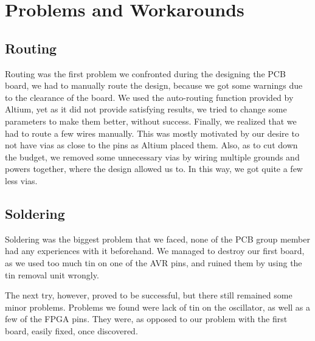 \section {Problems and Workarounds}
\subsection{Routing}
Routing was the first problem we confronted during the designing the \ac{PCB}
board, we had to manually route the design, because we got some warnings due to
the clearance of the board. We used the auto-routing function provided by
Altium, yet as it did not provide satisfying results, we tried to change some
parameters to make them better, without success. Finally, we realized that we
had to route a few wires manually. This was mostly motivated by our desire to
not have vias as close to the pins as Altium placed them. Also, as to cut down
the budget, we removed some unnecessary vias by wiring multiple grounds and
powers together, where the design allowed us to. In this way, we got quite a few
less vias.
\subsection{Soldering}
Soldering was the biggest problem that we faced, none of the \ac{PCB} group
member had any experiences with it beforehand. We managed to destroy our first
board, as we used too much tin on one of the AVR pins, and ruined them by using
the tin removal unit wrongly.

The next try, however, proved to be successful, but there still remained some
minor problems. Problems we found were lack of tin on the oscillator, as well as
a few of the \ac{FPGA} pins. They were, as opposed to our problem with the first
board, easily fixed, once discovered.


